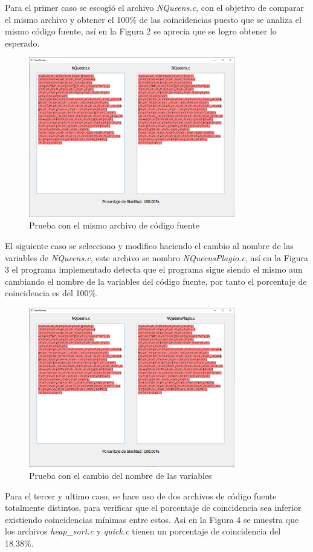 \documentclass[12pt,twoside]{article}
\begin{document}
    Para el primer caso se escogi\'o el archivo {\it NQueens.c}, con el objetivo de comparar el mismo archivo y obtener el 100\% de las coincidencias puesto que se analiza el mismo c\'odigo fuente, as\'i en la Figura 2 se aprecia que se logro obtener lo esperado.
    \begin{figure}[H]
        \centering
        \includegraphics[width=9cm]{imagenes/i1.png}
        \caption{Prueba con el mismo archivo de c\'odigo fuente}
    \end{figure}
    El siguiente caso se selecciono y modifico haciendo el cambio al nombre de las variables de {\it NQueens.c}, este archivo se nombro {\it NQueensPlagio.c}, as\'i en la Figura 3 el programa implementado detecta que el programa sigue siendo el mismo aun cambiando el nombre de la variables del c\'odigo fuente, por tanto el porcentaje de coincidencia es del 100\%.
    \begin{figure}[H]
        \centering
        \includegraphics[width=9cm]{imagenes/i2.png}
        \caption{Prueba con el cambio del nombre de las variables}
    \end{figure}
    Para el tercer y ultimo caso, se hace uso de dos archivos de c\'odigo fuente totalmente distintos, para verificar que el porcentaje de coincidencia sea inferior existiendo coincidencias m\'inimas entre estos. Asi en la Figura 4 se muestra que los archivos {\it heap\_sort.c} y {\it quick.c} tienen un porcentaje de coincidencia del 18.38\%.
\end{document}

